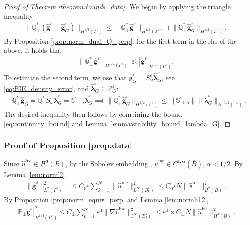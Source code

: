 \documentclass[]{article}
\numberwithin{equation}{section}
\numberwithin{theorem}{section}
\numberwithin{lemma}{section}
\numberwithin{corollary}{section}
\numberwithin{proposition}{section}
\numberwithin{definition}{section}
\newcommand{\blambda}{\boldsymbol{\lambda}}
\newcommand{\re}{\varepsilon}
\renewcommand{\vec}{\boldsymbol}
\newcommand{\inc}{\operatorname{inc}}
\begin{document}
	\begin{proof}[Proof of Theorem \ref{theorem:bounds_data}]
		We begin by applying the triangle inequality 
		\begin{align*}%
			\| \mathbb{Q}^*_{\perp} (\hat{\vec{g}}^{\re} - \hat{\vec{g}}^{\re}_G) \|_{H^{1/2}(\Gamma^{\re})} \leq \| \mathbb{Q}^*_{\perp} \hat{\vec{g}}^{\re} \|_{H^{1/2}(\Gamma^{\re})} + \| \mathbb{Q}^*_{\perp} \hat{\vec{g}}^{\re}_G \|_{H^{1/2}(\Gamma^{\re})}.
		\end{align*}
		By Proposition \ref{prop:norm_dual_Q_perp}, for the first term in the rhs of the above, it holds that
		\begin{align*}%
			\| \mathbb{Q}^*_{\perp} \hat{\vec{g}}^{\re} \|_{H^{1/2}(\Gamma^{\re})} \lesssim  | \hat{\vec{\vec{g}}}^{\re}|_{H^{1/2}(\Gamma^{\re})}.
		\end{align*}
		To estimate the second term, we use that  $\hat{\vec{g}}^{\re}_G={S}^{\re}_{\omega}\hat{\blambda}^{\re}_G$, see \eqref{eq:BIE_density_error}, and $\hat{\blambda}_G^{\re}\in \mathcal{V}^{\re}_G$: 
		\begin{align*}%
			&\mathbb{Q}_{\perp}^*\hat{\vec{g}}^{\re}_G=\mathbb{Q}_{\perp}^*S^{\re}_{\omega}\hat{\blambda}_G^{\re}=\mathbb{S}_{\perp\sigma}^{\re}\hat{\blambda}_G^{\re} \implies \|	\mathbb{Q}_{\perp}^*\hat{\vec{g}}^{\re}_G\|_{H^{1/2}(\Gamma^{\re})}\leq \|\mathbb{S}_{\perp\sigma}^{\re}\|\|\hat{\blambda}_G^{\re}\|_{H^{-1/2}(\Gamma^{\re})}.
		\end{align*}
		The desired inequality then follows by combining the bound \eqref{eq:continuity_bound} and Lemma \ref{lemma:stability_bound_lambda_G}.
	\end{proof}
	\subsubsection{Proof of Proposition \ref{prop:data}}
	\label{sec:data_bound2}
	Since $\hat{u}^{\inc}\in H^3(B)$, by the Sobolev embedding \cite[Theorem 4.12, part 2]{adams}, $\hat{u}^{\inc}\in C^{1,\alpha}(\overline{B})$, $\alpha<1/2$. By Lemma \ref{lem:norml2},
	\begin{align*}%
		\|\hat{\vec{g}}^{\re} \|^2_{L^2(\Gamma^{\re})} &\leq C_0\re \sum_{k=1}^N  \|\hat{u}^{\operatorname{inc}} \|^2_{L^{\infty}(B^{\re}_k)} \leq C_0 \re N \|\hat{u}^{\operatorname{inc}} \|^2_{H^{2}(B)}.
	\end{align*}
	By Proposition \ref{prop:norm_equiv_perp} and Lemma \ref{lem:normh12},  
	\begin{align*}%
		| \mathbb{P}_{\perp}\hat {\vec{g}}^{\re} |^2_{H^{1/2}(\Gamma^{\re})} 
		\leq C_{\perp} \sum_{k=1}^N \re^{3} \| \nabla \hat{u}^{\operatorname{inc}} \|_{L^{\infty}(B^{\re}_k)} ^2\leq \re^{3} \times C_{\perp} N \| \hat{u}^{\operatorname{inc}}\|^2_{H^3(B)}.
	\end{align*}
\end{document}
